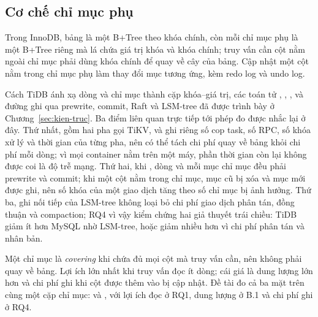 \subsection{Cơ chế chỉ mục phụ}
\label{subsec:co-che-index}

Trong InnoDB, bảng là một B+Tree theo khóa chính, còn mỗi chỉ mục phụ là một B+Tree riêng mà lá chứa giá trị khóa và khóa chính; truy vấn cần cột nằm ngoài chỉ mục phải dùng khóa chính để quay về cây của bảng. Cập nhật một cột nằm trong chỉ mục phụ làm thay đổi mục tương ứng, kèm redo log và undo log.

Cách TiDB ánh xạ dòng và chỉ mục thành cặp khóa--giá trị, các toán tử , , , và đường ghi qua prewrite, commit, Raft và LSM-tree đã được trình bày ở Chương~\ref{sec:kien-truc}. Ba điểm liên quan trực tiếp tới phép đo được nhắc lại ở đây. Thứ nhất,  gồm hai pha gọi TiKV, và  ghi riêng số cop task, số RPC, số khóa xử lý và thời gian của từng pha, nên có thể tách chi phí quay về bảng khỏi chi phí mỗi dòng; vì mọi container nằm trên một máy, phần thời gian còn lại không được coi là độ trễ mạng. Thứ hai, khi , dòng và mỗi mục chỉ mục đều phải prewrite và commit; khi  một cột nằm trong chỉ mục, mục cũ bị xóa và mục mới được ghi, nên số khóa của một giao dịch tăng theo số chỉ mục bị ảnh hưởng. Thứ ba, ghi nối tiếp của LSM-tree không loại bỏ chi phí giao dịch phân tán, đồng thuận và compaction; RQ4 vì vậy kiểm chứng hai giả thuyết trái chiều: TiDB giảm ít hơn MySQL nhờ LSM-tree, hoặc giảm nhiều hơn vì chi phí phân tán và nhân bản.

Một chỉ mục là \emph{covering} khi chứa đủ mọi cột mà truy vấn cần, nên không phải quay về bảng. Lợi ích lớn nhất khi truy vấn đọc ít dòng; cái giá là dung lượng lớn hơn và chi phí ghi khi cột được thêm vào bị cập nhật. Đề tài đo cả ba mặt trên cùng một cặp chỉ mục:  và , với lợi ích đọc ở RQ1, dung lượng ở B.1 và chi phí ghi ở RQ4.

